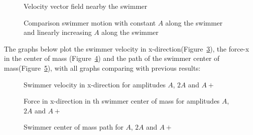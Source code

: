 \begin{figure}[H]
\centering
  \begin{footnotesize}
  
  \caption[Velocity vector field nearby the swimmer]{Velocity vector field nearby the swimmer}
   \label{fig:Bild4.12}
  \end{footnotesize}
\end{figure}

\begin{figure}[H]
\centering
  \begin{footnotesize}
  
  \caption[Comparison of swimmer motion with constant $A$ along the swimmer and linearly increasing $A$ along the swimmer]{Comparison swimmer motion with constant $A$ along the swimmer and linearly increasing $A$ along the swimmer}
   \label{fig:Bild4.13}
  \end{footnotesize}
\end{figure}


The graphs below plot the swimmer velocity in x-direction(Figure~\ref{fig:Bild4.14}), the force-x in the center of mass (Figure~\ref{fig:Bild4.15}) and the path of the swimmer center
of mass(Figure~\ref{fig:Bild4.16}), with all graphs comparing with previous results:



\begin{figure}[H]
\centering
  \begin{footnotesize}
  
  \caption[Swimmer velocity in x-direction for amplitudes $A$, $2A$ and $A+$ ]{Swimmer velocity in x-direction for amplitudes $A$, $2A$ and $A+$ }
   \label{fig:Bild4.14}
  \end{footnotesize}
\end{figure}


\begin{figure}[H]
\centering
  \begin{footnotesize}
  
  \caption[Force in x-direction in th swimmer center of mass for amplitudes $A$, $2A$ and $A+$]{Force in x-direction in th swimmer center of mass for amplitudes $A$, $2A$ and $A+$}
   \label{fig:Bild4.15}
  \end{footnotesize}
\end{figure}


\begin{figure}[H]
\centering
  \begin{footnotesize}
  
  \caption[Swimmer center of mass path for $A$, $2A$ and $A+$]{Swimmer center of mass path for $A$, $2A$ and $A+$}
   \label{fig:Bild4.16}
  \end{footnotesize}
\end{figure}


